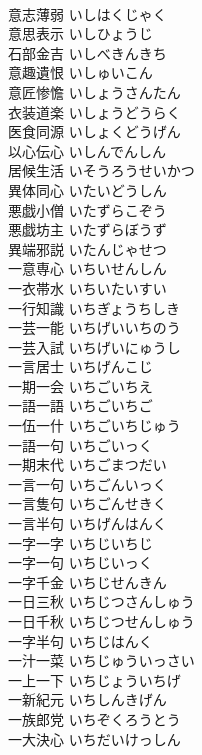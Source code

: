 \documentclass[8pt]{extreport}
\begin{document}
\begin{CJK}{UTF8}{min}
\\	意志薄弱	いしはくじゃく	
\\	意思表示	いしひょうじ	
\\	石部金吉	いしべきんきち	
\\	意趣遺恨	いしゅいこん	
\\	意匠惨憺	いしょうさんたん	
\\	衣装道楽	いしょうどうらく	
\\	医食同源	いしょくどうげん	
\\	以心伝心	いしんでんしん	
\\	居候生活	いそうろうせいかつ	
\\	異体同心	いたいどうしん	
\\	悪戯小僧	いたずらこぞう	
\\	悪戯坊主	いたずらぼうず	
\\	異端邪説	いたんじゃせつ	
\\	一意専心	いちいせんしん	
\\	一衣帯水	いちいたいすい	
\\	一行知識	いちぎょうちしき	
\\	一芸一能	いちげいいちのう	
\\	一芸入試	いちげいにゅうし	
\\	一言居士	いちげんこじ	
\\	一期一会	いちごいちえ	
\\	一語一語	いちごいちご	
\\	一伍一什	いちごいちじゅう	
\\	一語一句	いちごいっく	
\\	一期末代	いちごまつだい	
\\	一言一句	いちごんいっく	
\\	一言隻句	いちごんせきく	
\\	一言半句	いちげんはんく	
\\	一字一字	いちじいちじ	
\\	一字一句	いちじいっく	
\\	一字千金	いちじせんきん	
\\	一日三秋	いちじつさんしゅう	
\\	一日千秋	いちじつせんしゅう	
\\	一字半句	いちじはんく	
\\	一汁一菜	いちじゅういっさい	
\\	一上一下	いちじょういちげ	
\\	一新紀元	いちしんきげん	
\\	一族郎党	いちぞくろうとう	
\\	一大決心	いちだいけっしん	

\end{CJK}
\end{document}
